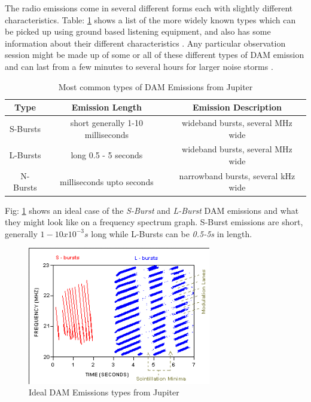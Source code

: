 \documentclass[runningheads,a4paper]{llncs}
\begin{document}
The radio emissions come in several different forms each with slightly different characteristics. Table: \ref{tab:dam_emissions} shows a list of the more widely known types which can be picked up using ground based listening equipment, and also has some information about their different characteristics \citep{wilkinson94}. Any particular observation session might be made up of some or all of these different types of \gls{DAM} emission and can last from a few minutes to several hours for larger noise storms \citep{wilkinson94}.

%
\begin{table}
  \centering
  \begin{tabular}[pos]{| c | c | c |}
    \hline
    Type & Emission Length & Emission Description\\ \hline
    S-Bursts & short generally 1-10 milliseconds & wideband bursts, several MHz wide\\ \hline
    L-Bursts & long 0.5 - 5 seconds & wideband bursts, several MHz wide\\ \hline
    N-Bursts & milliseconds upto seconds & narrowband bursts, several kHz wide\\
    \hline
  \end{tabular}
  \caption{Most common types of DAM Emissions from Jupiter \citep{wilkinson94}}
  \label{tab:dam_emissions}
\end{table}
%

Fig: \ref{fig:dam_emissions_spectrum} shows an ideal case of the \textit{S-Burst} and \textit{L-Burst} \gls{DAM} emissions and what they might look like on a frequency spectrum graph. S-Burst emissions are short, generally $1-10x10^{-3}s$ long while L-Bursts can be \textit{0.5-5s} in length.

%
\begin{figure}[here]
\centering
\includegraphics[width=8cm]{images/05}
\caption{Ideal DAM Emissions types from Jupiter \citep{wilkinson94}}
\label{fig:dam_emissions_spectrum}
\end{figure}
%
%
\newpage
\end{document}
